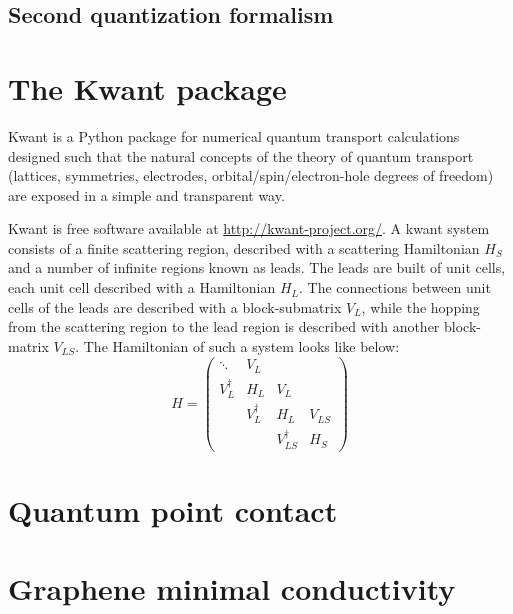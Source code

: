 \documentclass[11pt, a4paper, twocolumn]{article}
\begin{document}
\subsection*{Second quantization formalism}

\section*{The Kwant package}
Kwant is a Python package for numerical quantum transport calculations \cite{kwant-paper} 
designed such that the natural concepts of the theory of quantum transport (lattices, symmetries,
electrodes, orbital/spin/electron-hole degrees of freedom) are exposed in a simple and transparent way.

Kwant is free software available at \url{http://kwant-project.org/}. A kwant system consists of a finite scattering region,
described with a scattering Hamiltonian $H_S$ and a number of infinite regions known as leads.
The leads are built of unit cells, each unit cell described with a Hamiltonian $H_L$. The connections
between unit cells of the leads are described with a block-submatrix $V_L$, while the hopping from the scattering region
to the lead region is described with another block-matrix $V_{LS}$. The Hamiltonian of such a system looks like below:
\begin{equation*}
  H = \left(
    \begin{array}{cccc}
      \ddots     & V_L        &                  &        \\
      V_L^{\dag} & H_L        & V_L              &        \\
                 & V_L^{\dag} & H_L              &  V_{LS}\\
                 &            & V_{LS}^{\dag}    & H_S
    \end{array}
  \right)
\end{equation*}

\section*{Quantum point contact}
\section*{Graphene minimal conductivity}
\end{document}
